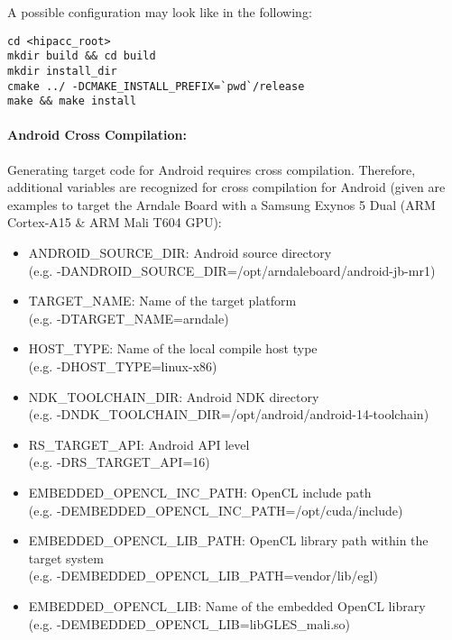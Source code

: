 A possible configuration may look like in the following:
\begin{lstlisting}
cd <hipacc_root>
mkdir build && cd build
mkdir install_dir
cmake ../ -DCMAKE_INSTALL_PREFIX=`pwd`/release
make && make install
\end{lstlisting}


\paragraph{Android Cross Compilation:}
Generating target code for Android requires cross compilation. Therefore,
additional variables are recognized for cross compilation for Android (given
are examples to target the Arndale Board with a Samsung Exynos 5 Dual (ARM
Cortex-A15 \& ARM Mali T604 GPU):

\begin{itemize}
    \item ANDROID\_SOURCE\_DIR:         Android source directory\\(e.g. -DANDROID\_SOURCE\_DIR=/opt/arndaleboard/android-jb-mr1)
    \item TARGET\_NAME:                 Name of the target platform\\(e.g. -DTARGET\_NAME=arndale)
    \item HOST\_TYPE:                   Name of the local compile host type\\(e.g. -DHOST\_TYPE=linux-x86)
    \item NDK\_TOOLCHAIN\_DIR:          Android NDK directory\\(e.g. -DNDK\_TOOLCHAIN\_DIR=/opt/android/android-14-toolchain)
    \item RS\_TARGET\_API:              Android API level\\(e.g. -DRS\_TARGET\_API=16)
    \item EMBEDDED\_OPENCL\_INC\_PATH:  OpenCL include path\\(e.g. -DEMBEDDED\_OPENCL\_INC\_PATH=/opt/cuda/include)
    \item EMBEDDED\_OPENCL\_LIB\_PATH:  OpenCL library path within the target system\\(e.g. -DEMBEDDED\_OPENCL\_LIB\_PATH=vendor/lib/egl)
    \item EMBEDDED\_OPENCL\_LIB:        Name of the embedded OpenCL library\\(e.g. -DEMBEDDED\_OPENCL\_LIB=libGLES\_mali.so)
\end{itemize}

